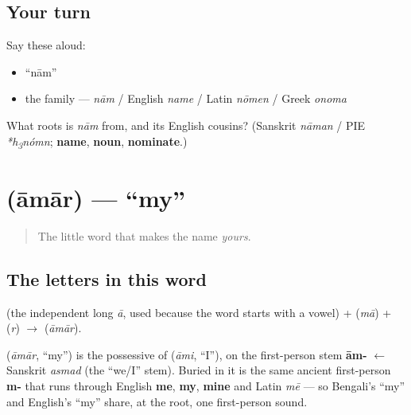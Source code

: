 \subsection*{Your turn}
Say these aloud:

\begin{itemize}
\raggedright
  \item \textquotedblleft{}nām\textquotedblright{}
  \item the family — \emph{nām} / English \emph{name} / Latin \emph{nōmen} / Greek \emph{onoma}
\end{itemize}

\begin{tcolorbox}[breakable,colback=teal!4,colframe=teal!35!black,title={Before you move on}]
What roots is \emph{nām} from, and its English cousins? (Sanskrit \emph{nāman} / PIE \emph{*h\textsubscript{3}nómn}; \textbf{name}, \textbf{noun}, \textbf{nominate}.)
\end{tcolorbox}
\section[\bn{আমার}]{ (āmār) — \textquotedblleft{}my\textquotedblright{}}

\label{lesson:BN-C02-amar}



\begin{quote}
The little word that makes the name \emph{yours}.
\end{quote}

\subsection*{The letters in this word}
\textbf{} (the independent long \emph{ā}, used because the word starts with a vowel) + \textbf{} (\emph{mā}) + \textbf{} (\emph{r}) $\to$ \textbf{} (\emph{āmār}).

\begin{cousinweb}
\textbf{} (\emph{āmār}, \textquotedblleft{}my\textquotedblright{}) is the possessive of \textbf{} (\emph{āmi}, \textquotedblleft{}I\textquotedblright{}), on the first-person stem \textbf{ām-} $\leftarrow$ Sanskrit \emph{asmad} (the \textquotedblleft{}we/I\textquotedblright{} stem). Buried in it is the same ancient first-person \textbf{m-} that runs through English \textbf{me}, \textbf{my}, \textbf{mine} and Latin \emph{mē} — so Bengali's \textquotedblleft{}my\textquotedblright{} and English's \textquotedblleft{}my\textquotedblright{} share, at the root, one first-person sound.
\end{cousinweb}

